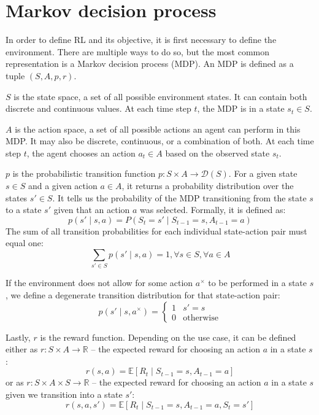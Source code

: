 \documentclass[
  digital,     %
  oneside,     %
  nosansbold,  %
  nocolorbold, %
  lof,         %
  lot,         %
]{fithesis4}
\begin{document}
\section{Markov decision process}
In order to define RL and its objective, it is first necessary to define the environment. There are multiple ways to do so, but the most common representation is a Markov decision process (MDP). An MDP is defined as a tuple $(S, A, p, r)$.

$S$ is the state space, a set of all possible environment states. It can contain both discrete and continuous values. At each time step $t$, the MDP is in a state $s_t\in S$.

$A$ is the action space, a set of all possible actions an agent can perform in this MDP. It may also be discrete, continuous, or a combination of both. At each time step $t$, the agent chooses an action $a_t\in A$ based on the observed state $s_t$.

$p$ is the probabilistic transition function $p\colon S \times A \to \mathcal{D}(S)$. For a given state $s\in S$ and a given action $a\in A$, it returns a probability distribution over the states $s'\in S$. It tells us the probability of the MDP transitioning from the state $s$ to a state $s'$ given that an action $a$ was selected. Formally, it is defined as:
\begin{equation}
p(s' \mid s,a)=P(S_t=s'\mid S_{t-1}=s,A_{t-1}=a)    
\end{equation}
The sum of all transition probabilities for each individual state-action pair must equal one:
\begin{equation}
\sum_{s'\in S} p(s'\mid s,a)=1, \forall s \in S, \forall a \in A
\end{equation}

If the environment does not allow for some action $a^{\times}$ to be performed in a state $s$, we define a degenerate transition distribution for that state-action pair:
\begin{equation}
    p(s'\mid s, a^{\times}) =\begin{cases}1 & s' = s\\0 & \text{otherwise} \end{cases} 
\end{equation}

Lastly, $r$ is the reward function. Depending on the use case, it can be defined either as $r\colon S \times A \to \mathbb{R}$ \cite{PA230} -- the expected reward for choosing an action $a$ in a state $s$:
\begin{equation}
r(s,a)= \mathbb{E} [R_t\mid S_{t-1}=s, A_{t-1}=a]
\end{equation}
or as $r\colon S\times A \times S \to \mathbb{R}$ -- the expected reward for choosing an action $a$ in a state $s$ given we transition into a state $s'$:
\begin{equation}
r(s, a, s')= \mathbb{E} [R_t\mid S_{t-1}=s, A_{t-1}=a, S_t=s']
\end{equation}
\end{document}

